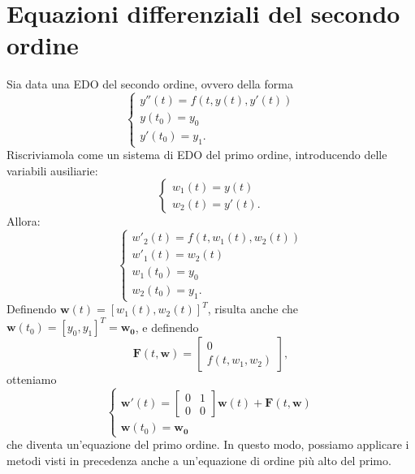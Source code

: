 \section{Equazioni differenziali del secondo ordine}
Sia data una EDO del secondo ordine, ovvero della forma
\begin{equation*}
\begin{cases}
y''(t) =f( t,y(t) ,y'(t))\\
y( t_{0}) =y_{0}\\
y'( t_{0}) =y_{1}.
\end{cases}
\end{equation*}
Riscriviamola come un sistema di EDO del primo ordine, introducendo delle variabili ausiliarie:
\begin{equation*}
\begin{cases}
w_{1}(t) =y(t)\\
w_{2}(t) =y'(t).
\end{cases}
\end{equation*}
Allora:
\begin{equation*}
\begin{cases}
w'_{2}(t) =f( t,w_{1}(t) ,w_{2}(t))\\
w'_{1}(t) =w_{2}(t)\\
w_{1}( t_{0}) =y_{0}\\
w_{2}( t_{0}) =y_{1}.
\end{cases}
\end{equation*}
Definendo $\mathbf{w}(t) =[ w_{1}(t) ,w_{2}(t)]^{T}$, risulta anche che $\mathbf{w}( t_{0}) =[ y_{0} ,y_{1}]^{T} =\mathbf{w_{0}}$, e definendo
$$\mathbf{F}( t,\mathbf{w}) =\begin{bmatrix}
0\\
f( t,w_{1} ,w_{2})
\end{bmatrix},$$
otteniamo
\begin{equation*}
\begin{cases}
\mathbf{w} '(t) =\begin{bmatrix}
0 & 1\\
0 & 0
\end{bmatrix}\mathbf{w}(t) +\mathbf{F}( t,\mathbf{w})\\
\mathbf{w}( t_{0}) =\mathbf{w_{0}}
\end{cases}
\end{equation*}
che diventa un'equazione del primo ordine.
In questo modo, possiamo applicare i metodi visti in precedenza anche a un'equazione di ordine più alto del primo.
